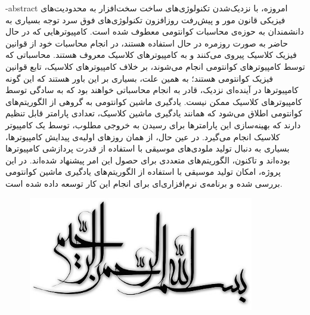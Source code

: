 \department{}

\fa-abstract{
امروزه، با نزدیک‌شدن تکنولوژی‌های ساخت سخت‌افزار به محدودیت‌های فیزیکی قانون مور
و پیش‌رفت روزافزون تکنولوژی‌های فوق سرد
توجه بسیاری به دانشمندان به حوزه‌ی محاسبات کوانتومی معطوف شده است. 
کامپیوترهایی که در حال حاضر به صورت روزمره در حال استفاده هستند، در انجام محاسبات خود از قوانین فیزیک کلاسیک پیروی می‌کنند و به کامپیوترهای کلاسیک معروف هستند.
محاسباتی که توسط کامپیوترهای کوانتومی انجام می‌شوند، بر خلاف کامپیوترهای کلاسیک، تابع قوانین فیزیک کوانتومی هستند؛ به همین علت، بسیاری بر این باور هستند که این گونه کامپیوترها در آینده‌ای نزدیک، قادر به انجام محاسباتی خواهند بود که به سادگی توسط کامپیوترهای کلاسیک ممکن نیست.
یادگیری ماشین کوانتومی
به گروهی از الگوریتم‌های کوانتومی اطلاق می‌شود که همانند یادگیری ماشین کلاسیک، تعدادی پارامتر قابل تنظیم دارند که بهینه‌سازی این پارامترها برای رسیدن به خروجی مطلوب، توسط یک کامپیوتر کلاسیک انجام می‌گیرد.
در عین حال، از همان روزهای اولیه‌ی پیدایش کامپیوترها، بسیاری به دنبال تولید ملودی‌های موسیقی با استفاده از قدرت پردازشی کامپیوترها بوده‌اند و تاکنون، الگوریتم‌های متعددی برای حصول این امر پیشنهاد شده‌اند.
در این پروژه، امکان تولید موسیقی با استفاده از الگوریتم‌های یادگیری ماشین کوانتومی بررسی شده و برنامه‌ی نرم‌افزاری‌ای برای انجام این کار توسعه داده شده است.
}





\AUTtitle
\vspace*{7cm}
\thispagestyle{empty}
\begin{center}
\includegraphics[height=5cm,width=12cm]{figures/besm.jpg}
\end{center}